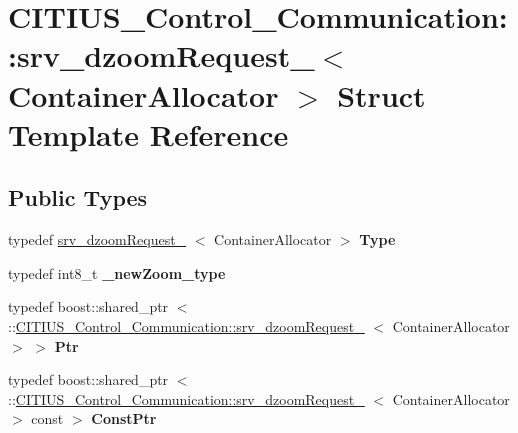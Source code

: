 \hypertarget{struct_c_i_t_i_u_s___control___communication_1_1srv__dzoom_request__}{\section{\-C\-I\-T\-I\-U\-S\-\_\-\-Control\-\_\-\-Communication\-:\-:srv\-\_\-dzoom\-Request\-\_\-$<$ \-Container\-Allocator $>$ \-Struct \-Template \-Reference}
\label{struct_c_i_t_i_u_s___control___communication_1_1srv__dzoom_request__}
}
\subsection*{\-Public \-Types}
\begin{DoxyCompactItemize}
\item 
\hypertarget{struct_c_i_t_i_u_s___control___communication_1_1srv__dzoom_request___abe4fee8fb93b55831e1da37e339458f3}{typedef \hyperlink{struct_c_i_t_i_u_s___control___communication_1_1srv__dzoom_request__}{srv\-\_\-dzoom\-Request\-\_\-}\*
$<$ \-Container\-Allocator $>$ {\bfseries \-Type}}\label{struct_c_i_t_i_u_s___control___communication_1_1srv__dzoom_request___abe4fee8fb93b55831e1da37e339458f3}

\item 
\hypertarget{struct_c_i_t_i_u_s___control___communication_1_1srv__dzoom_request___a48516a9656303d66a6079e8ea53447fe}{typedef int8\-\_\-t {\bfseries \-\_\-new\-Zoom\-\_\-type}}\label{struct_c_i_t_i_u_s___control___communication_1_1srv__dzoom_request___a48516a9656303d66a6079e8ea53447fe}

\item 
\hypertarget{struct_c_i_t_i_u_s___control___communication_1_1srv__dzoom_request___aad1d9e26e8288f1b6447c06aeee795f9}{typedef boost\-::shared\-\_\-ptr\*
$<$ \-::\hyperlink{struct_c_i_t_i_u_s___control___communication_1_1srv__dzoom_request__}{\-C\-I\-T\-I\-U\-S\-\_\-\-Control\-\_\-\-Communication\-::srv\-\_\-dzoom\-Request\-\_\-}\*
$<$ \-Container\-Allocator $>$ $>$ {\bfseries \-Ptr}}\label{struct_c_i_t_i_u_s___control___communication_1_1srv__dzoom_request___aad1d9e26e8288f1b6447c06aeee795f9}

\item 
\hypertarget{struct_c_i_t_i_u_s___control___communication_1_1srv__dzoom_request___aa3240ffe77e8fd91d652308eea3bbe67}{typedef boost\-::shared\-\_\-ptr\*
$<$ \-::\hyperlink{struct_c_i_t_i_u_s___control___communication_1_1srv__dzoom_request__}{\-C\-I\-T\-I\-U\-S\-\_\-\-Control\-\_\-\-Communication\-::srv\-\_\-dzoom\-Request\-\_\-}\*
$<$ \-Container\-Allocator $>$ const  $>$ {\bfseries \-Const\-Ptr}}\label{struct_c_i_t_i_u_s___control___communication_1_1srv__dzoom_request___aa3240ffe77e8fd91d652308eea3bbe67}

\end{DoxyCompactItemize}

